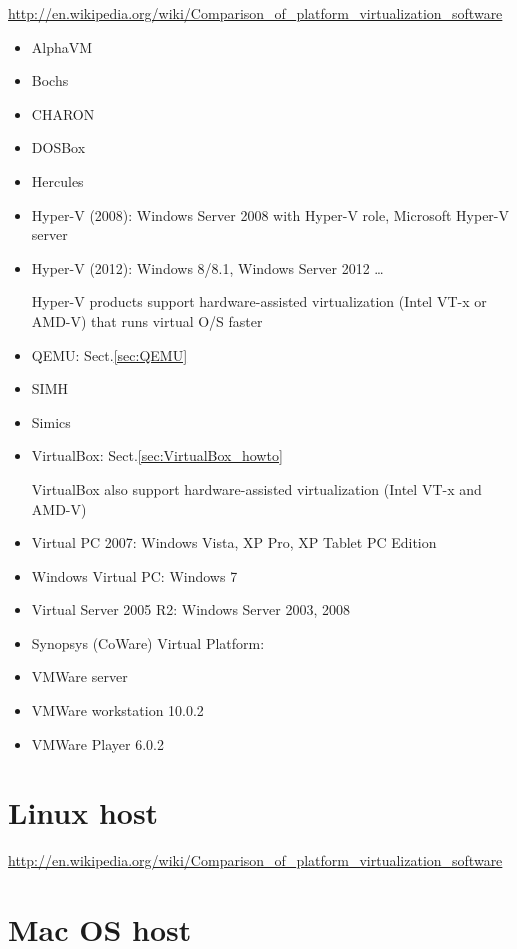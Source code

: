 \url{http://en.wikipedia.org/wiki/Comparison_of_platform_virtualization_software}
\begin{itemize}
  \item AlphaVM
  \item Bochs
  \item CHARON
  \item DOSBox
  \item Hercules
  \item Hyper-V (2008): Windows Server 2008 with Hyper-V role, Microsoft Hyper-V
  server
  \item Hyper-V (2012): Windows 8/8.1, Windows Server 2012 \ldots
  
  Hyper-V products support hardware-assisted virtualization (Intel VT-x or
  AMD-V) that runs virtual O/S faster

  \item QEMU: Sect.\ref{sec:QEMU}
    
  \item SIMH
  \item Simics
  \item VirtualBox: Sect.\ref{sec:VirtualBox_howto}
  
  VirtualBox also support hardware-assisted virtualization (Intel VT-x
  and AMD-V)
  
  \item Virtual PC 2007: Windows Vista, XP Pro, XP Tablet PC Edition
  
  \item Windows Virtual PC: Windows 7
  \item Virtual Server 2005 R2: Windows Server 2003, 2008
  
  \item Synopsys (CoWare) Virtual Platform:
  
  \item VMWare server
  \item VMWare workstation 10.0.2
  \item VMWare Player 6.0.2
\end{itemize}

\section{Linux host}

\url{http://en.wikipedia.org/wiki/Comparison_of_platform_virtualization_software}

\section{Mac OS host}

